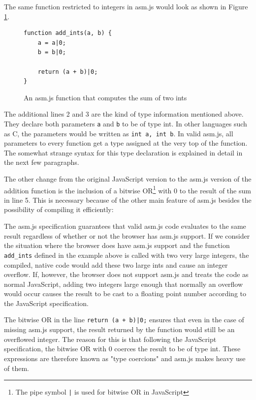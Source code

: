 \documentclass[11pt]{report}
\begin{document}
The same function restricted to integers in asm.js would look as shown in Figure \ref{asmjsadder}.

\begin{figure}[ht]
\begin{lstlisting}
function add_ints(a, b) {
    a = a|0;
    b = b|0;
    
    return (a + b)|0;
}
\end{lstlisting}
\caption{An asm.js function that computes the sum of two ints}
\label{asmjsadder}
\end{figure}

The additional lines 2 and 3 are the kind of type information mentioned above. They declare both parameters \texttt{a} and \texttt{b} to be of type int. In other languages such as C, the parameters would be written as \texttt{int a, int b}. In valid asm.js, all parameters to every function get a type assigned at the very top of the function. The somewhat strange syntax for this type declaration is explained in detail in the next few paragraphs.

The other change from the original JavaScript version to the asm.js version of the addition function is the inclusion of a bitwise OR\footnote{The pipe symbol \texttt{|} is used for bitwise OR in JavaScript} with 0 to the result of the sum in line 5. This is necessary because of the other main feature of asm.js besides the possibility of compiling it efficiently:

The asm.js specification \cite{asmjsspec} guarantees that valid asm.js code evaluates to the same result regardless of whether or not the browser has asm.js support. If we consider the situation where the browser does have asm.js support and the function \texttt{add_ints} defined in the example above is called with two very large integers, the compiled, native code would add these two large ints and cause an integer overflow. If, however, the browser does not support asm.js and treats the code as normal JavaScript, adding two integers large enough that normally an overflow would occur causes the result to be cast to a floating point number according to the JavaScript specification.

The bitwise OR in the line \texttt{return (a + b)|0;} ensures that even in the case of missing asm.js support, the result returned by the function would still be an overflowed integer. The reason for this is that following the JavaScript specification, the bitwise OR with 0 coerces the result to be of type int. These expressions are therefore known as "type coercions" and asm.js makes heavy use of them.
\end{document}
